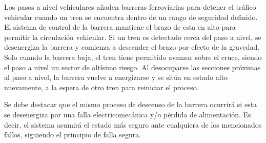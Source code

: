 Los pasos a nivel vehiculares añaden barreras ferroviarias para detener el tráfico vehicular cuando un tren se encuentra dentro de un rango de seguridad definido.  El sistema de control de la barrera mantiene el brazo de esta en alto para permitir la circulación vehicular. Si un tren es detectado cerca del paso a nivel, se desenergiza la barrera y comienza a descender el brazo por efecto de la gravedad. Solo cuando la barrera baja, el tren tiene permitido avanzar sobre el cruce, siendo el paso a nivel un sector de altísimo riesgo. Al desocuparse las secciones próximas al paso a nivel, la barrera vuelve a energizarse y se sitúa en estado alto nuevamente, a la espera de otro tren para reiniciar el proceso. 

Se debe destacar que el mismo proceso de descenso de la barrera ocurrirá si esta se desenergiza por una falla electricomecánica y/o pérdida de alimentación. Es decir, el sistema asumirá el estado más seguro ante cualquiera de los mencionados fallos, siguiendo el principio de falla segura.
